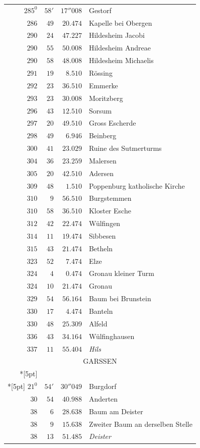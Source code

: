 \clearpage
{}%
\begingroup
\fontsize{10.5}{13}\selectfont
\setlength{\tabcolsep}{3pt}
\setlength{\LTpre}{2pt}
\setlength{\LTpost}{2pt}
\begin{longtable}{@{}rrrp{.61\linewidth}@{}}
\(285^{0}\)&\(58'\)&\(17''008\)&\raggedright Gestorf\tabularnewline
\(286\)&\(49\)&\(20.474\)&\raggedright Kapelle bei Obergen\tabularnewline
\(290\)&\(24\)&\(47.227\)&\raggedright Hildesheim Jacobi\tabularnewline
\(290\)&\(55\)&\(50.008\)&\raggedright Hildesheim Andreae\tabularnewline
\(290\)&\(58\)&\(48.008\)&\raggedright Hildesheim Michaelis\tabularnewline
\(291\)&\(19\)&\(8.510\)&\raggedright Rössing\tabularnewline
\(292\)&\(23\)&\(36.510\)&\raggedright Emmerke\tabularnewline
\(293\)&\(23\)&\(30.008\)&\raggedright Moritzberg\tabularnewline
\(296\)&\(43\)&\(12.510\)&\raggedright Sorsum\tabularnewline
\(297\)&\(20\)&\(49.510\)&\raggedright Gross Escherde\tabularnewline
\(298\)&\(49\)&\(6.946\)&\raggedright Beinberg\tabularnewline
\(300\)&\(41\)&\(23.029\)&\raggedright Ruine des Sutmerturms\tabularnewline
\(304\)&\(36\)&\(23.259\)&\raggedright Malersen\tabularnewline
\(305\)&\(20\)&\(42.510\)&\raggedright Adersen\tabularnewline
\(309\)&\(48\)&\(1.510\)&\raggedright Poppenburg katholische Kirche\tabularnewline
\(310\)&\(9\)&\(56.510\)&\raggedright Burgstemmen\tabularnewline
\(310\)&\(58\)&\(36.510\)&\raggedright Kloster Esche\tabularnewline
\(312\)&\(42\)&\(22.474\)&\raggedright Wülfingen\tabularnewline
\(314\)&\(11\)&\(19.474\)&\raggedright Sibbesen\tabularnewline
\(315\)&\(43\)&\(21.474\)&\raggedright Betheln\tabularnewline
\(323\)&\(52\)&\(7.474\)&\raggedright Elze\tabularnewline
\(324\)&\(4\)&\(0.474\)&\raggedright Gronau kleiner Turm\tabularnewline
\(324\)&\(10\)&\(21.474\)&\raggedright Gronau\tabularnewline
\(329\)&\(54\)&\(56.164\)&\raggedright Baum bei Brunstein\tabularnewline
\(330\)&\(17\)&\(4.474\)&\raggedright Banteln\tabularnewline
\(330\)&\(48\)&\(25.309\)&\raggedright Alfeld\tabularnewline
\(336\)&\(43\)&\(34.164\)&\raggedright Wülfinghausen\tabularnewline
\(337\)&\(11\)&\(55.404\)&\raggedright \textit{Hils}\tabularnewline
\multicolumn{4}{c}{\strut GARSSEN}\\*[5pt]
\multicolumn{4}{c}{\(-125867.401\)\qquad\(-13888.808\)}\\*[5pt]
\(21^{0}\)&\(54'\)&\(30''049\)&\raggedright Burgdorf\tabularnewline
\(30\)&\(54\)&\(40.988\)&\raggedright Anderten\tabularnewline
\(38\)&\(6\)&\(28.638\)&\raggedright Baum am Deister\tabularnewline
\(38\)&\(9\)&\(15.638\)&\raggedright Zweiter Baum an derselben Stelle\tabularnewline
\(38\)&\(13\)&\(51.485\)&\raggedright \textit{Deister}\tabularnewline

\end{longtable}
